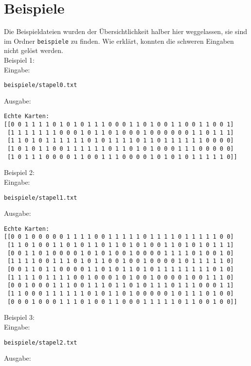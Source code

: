 \documentclass[a4paper,10pt,ngerman]{scrartcl}
\begin{document}
\section{Beispiele}
Die Beispieldateien wurden der Übersichtlichkeit halber hier weggelassen, sie sind im Ordner \lstinline|beispiele| zu finden. Wie erklärt, konnten die schweren Eingaben nicht gelöst werden.\\
Beispiel 1: \\
Eingabe:
\begin{lstlisting}
beispiele/stapel0.txt
\end{lstlisting}
Ausgabe:
\begin{lstlisting}
Echte Karten:
[[0 0 1 1 1 1 0 1 0 1 0 1 1 1 0 0 0 1 1 0 1 0 0 1 1 0 0 1 1 0 0 1] 
 [1 1 1 1 1 1 1 0 0 0 1 0 1 1 0 1 0 0 0 1 0 0 0 0 0 0 1 1 0 1 1 1] 
 [1 1 0 1 0 1 1 1 1 1 1 0 1 0 1 1 1 1 0 1 1 0 1 1 1 1 1 1 0 0 0 0] 
 [1 0 1 0 1 1 0 0 1 1 1 1 1 1 0 1 1 0 1 0 1 0 0 0 1 1 1 0 0 0 0 0] 
 [1 0 1 1 1 0 0 0 0 1 1 0 0 1 1 1 0 0 0 0 1 0 1 0 1 0 1 1 1 1 1 0]]
\end{lstlisting}
Beispiel 2: \\
Eingabe:
\begin{lstlisting}
beispiele/stapel1.txt
\end{lstlisting}
Ausgabe:
\begin{lstlisting}
Echte Karten:
[[0 0 1 0 0 0 0 0 1 1 1 1 0 0 1 1 1 1 1 0 1 1 1 1 0 1 1 1 1 1 0 0]
 [1 1 0 1 0 0 1 1 0 1 0 1 1 0 1 1 0 1 0 1 0 0 1 1 0 1 0 1 0 1 1 1]
 [0 0 1 1 0 1 0 0 0 0 1 0 1 0 1 0 0 1 0 0 0 0 1 1 1 1 0 1 0 0 1 0]
 [1 1 1 1 0 0 1 1 1 0 1 0 1 1 0 0 1 0 0 1 0 0 0 0 1 0 1 1 1 1 1 0]
 [0 0 1 1 0 1 1 0 0 0 0 1 1 0 1 0 1 1 0 1 0 1 1 1 1 1 1 1 1 0 1 0]
 [1 1 1 1 0 1 1 1 1 0 0 1 0 0 0 1 0 1 0 0 1 0 0 0 0 1 0 0 1 1 1 0]
 [0 0 1 0 0 0 1 1 1 0 0 1 1 1 0 1 1 0 1 0 1 1 1 0 1 1 1 0 0 0 1 1]
 [1 1 0 0 0 1 1 1 1 1 1 0 1 0 1 1 0 1 0 0 0 0 0 1 0 1 1 1 0 1 0 0]
 [0 0 0 1 0 0 0 1 1 1 0 1 0 0 1 1 0 0 0 1 1 1 1 1 0 1 1 0 0 1 0 0]]
\end{lstlisting}
Beispiel 3: \\
Eingabe:
\begin{lstlisting}
beispiele/stapel2.txt
\end{lstlisting}
Ausgabe:
\end{document}
